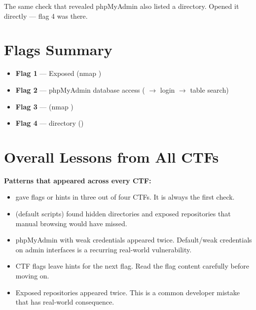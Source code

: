 \begin{takebox}
The same  check that revealed phpMyAdmin also listed a
 directory. Opened it directly --- flag 4 was there.

\section*{Flags Summary}

\begin{checkbox}
\begin{itemize}
  \item[$\checkmark$] \textbf{Flag 1} --- Exposed  (nmap )
  \item[$\checkmark$] \textbf{Flag 2} --- phpMyAdmin database access
        ( $\rightarrow$ login $\rightarrow$ table search)
  \item[$\checkmark$] \textbf{Flag 3} --- 
        (nmap )
  \item[$\checkmark$] \textbf{Flag 4} ---  directory
        ()
\end{itemize}
\end{checkbox}

\section*{Overall Lessons from All CTFs}

\begin{takebox}
\textbf{Patterns that appeared across every CTF:}
\begin{itemize}
  \item {} gave flags or hints in three out of four CTFs.
        It is always the first check.
  \item {} (default scripts) found hidden directories and
        exposed repositories that manual browsing would have missed.
  \item phpMyAdmin with weak credentials appeared twice. Default/weak credentials
        on admin interfaces is a recurring real-world vulnerability.
  \item CTF flags leave hints for the next flag. Read the flag content carefully
        before moving on.
  \item Exposed  repositories appeared twice. This is a common
        developer mistake that has real-world consequence.
\end{itemize}


\end{takebox}
\end{takebox}

